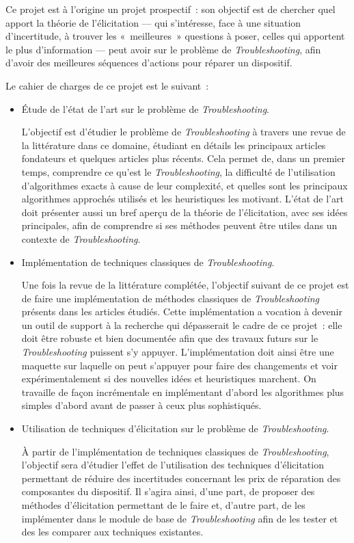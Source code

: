\documentclass[a4paper,11pt]{article}
\theoremstyle{plain}
\theoremstyle{definition}
\begin{document}
Ce projet est à l'origine un projet prospectif~: son objectif est de chercher quel apport la théorie de l'élicitation --- qui s'intéresse, face à une situation d'incertitude, à trouver les «~meilleures~» questions à poser, celles qui apportent le plus d'information --- peut avoir sur le problème de \emph{Troubleshooting}, afin d'avoir des meilleures séquences d'actions pour réparer un dispositif.

Le cahier de charges de ce projet est le suivant~:
\begin{itemize}
\item Étude de l'état de l'art sur le problème de \emph{Troubleshooting}.

L'objectif est d'étudier le problème de \emph{Troubleshooting} à travers une revue de la littérature dans ce domaine, étudiant en détails les principaux articles fondateurs et quelques articles plus récents. Cela permet de, dans un premier temps, comprendre ce qu'est le \emph{Troubleshooting}, la difficulté de l'utilisation d'algorithmes exacts à cause de leur complexité, et quelles sont les principaux algorithmes approchés utilisés et les heuristiques les motivant. L'état de l'art doit présenter aussi un bref aperçu de la théorie de l'élicitation, avec ses idées principales, afin de comprendre si ses méthodes peuvent être utiles dans un contexte de \emph{Troubleshooting}.

\item Implémentation de techniques classiques de \emph{Troubleshooting}.

Une fois la revue de la littérature complétée, l'objectif suivant de ce projet est de faire une implémentation de méthodes classiques de \emph{Troubleshooting} présents dans les articles étudiés. Cette implémentation a vocation à devenir un outil de support à la recherche qui dépasserait le cadre de ce projet~: elle doit être robuste et bien documentée afin que des travaux futurs sur le \emph{Troubleshooting} puissent s'y appuyer. L'implémentation doit ainsi être une maquette sur laquelle on peut s'appuyer pour faire des changements et voir expérimentalement si des nouvelles idées et heuristiques marchent. On travaille de façon incrémentale en implémentant d'abord les algorithmes plus simples d'abord avant de passer à ceux plus sophistiqués.

\item Utilisation de techniques d'élicitation sur le problème de \emph{Troubleshooting}.

À partir de l'implémentation de techniques classiques de \emph{Troubleshooting}, l'objectif sera d'étudier l'effet de l'utilisation des techniques d'élicitation permettant de réduire des incertitudes concernant les prix de réparation des composantes du dispositif. Il s'agira ainsi, d'une part, de proposer des méthodes d'élicitation permettant de le faire et, d'autre part, de les implémenter dans le module de base de \emph{Troubleshooting} afin de les tester et des les comparer aux techniques existantes.


\end{itemize}
\end{document}
